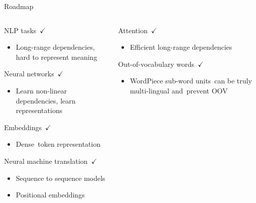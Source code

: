 \documentclass[12pt]{beamer}
\begin{document}
\begin{frame}{Roadmap}
	
	\begin{columns}
		
		\begin{column}{0.5\linewidth}
			
			
			NLP tasks $\checkmark$
			
			\begin{itemize}
				\item {\scriptsize Long-range dependencies, hard to represent meaning}
			\end{itemize}
			
			Neural networks $\checkmark$
			
			\begin{itemize}
				\item {\scriptsize Learn non-linear dependencies, learn representations}
			\end{itemize}
			
			Embeddings $\checkmark$
			
			\begin{itemize}
				\item {\scriptsize Dense token representation}
			\end{itemize}
			
			Neural machine translation $\checkmark$
			
			\begin{itemize}
				\item {\scriptsize Sequence to sequence models}
				\item {\scriptsize Positional embeddings}
			\end{itemize}
			
		\end{column}
		
		\begin{column}{0.5\linewidth}
			
			Attention $\checkmark$
			
			\begin{itemize}
				\item {\scriptsize Efficient long-range dependencies}
			\end{itemize}
			
			
			Out-of-vocabulary words $\checkmark$
			
			\begin{itemize}
				\item {\scriptsize WordPiece sub-word units can be truly multi-lingual and prevent OOV}
			\end{itemize}
			

\end{column}
\end{columns}
\end{frame}
\end{document}
